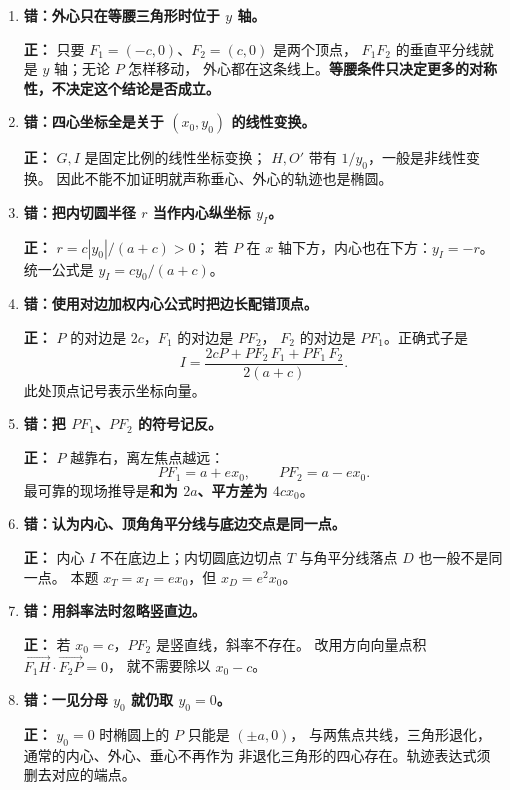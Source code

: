 \begin{trapbox}
\begin{enumerate}
 \item \textbf{错：外心只在等腰三角形时位于 $y$ 轴。}

 \textbf{正：} 只要 $F_1=(-c,0)$、$F_2=(c,0)$ 是两个顶点，
 $F_1F_2$ 的垂直平分线就是 $y$ 轴；无论 $P$ 怎样移动，
 外心都在这条线上。\textbf{等腰条件只决定更多的对称性，不决定这个结论是否成立。}

 \item \textbf{错：四心坐标全是关于 $(x_0,y_0)$ 的线性变换。}

 \textbf{正：} $G,I$ 是固定比例的线性坐标变换；
 $H,O'$ 带有 $1/y_0$，一般是非线性变换。
 因此不能不加证明就声称垂心、外心的轨迹也是椭圆。

 \item \textbf{错：把内切圆半径 $r$ 当作内心纵坐标 $y_I$。}

 \textbf{正：} $r=c|y_0|/(a+c)>0$；
 若 $P$ 在 $x$ 轴下方，内心也在下方：$y_I=-r$。
 统一公式是 $\displaystyle y_I=cy_0/(a+c)$。

 \item \textbf{错：使用对边加权内心公式时把边长配错顶点。}

 \textbf{正：} $P$ 的对边是 $2c$，$F_1$ 的对边是 $PF_2$，
 $F_2$ 的对边是 $PF_1$。正确式子是
 \[
 I=\frac{2cP+PF_2\,F_1+PF_1\,F_2}{2(a+c)}.
 \]
 此处顶点记号表示坐标向量。

 \item \textbf{错：把 $PF_1$、$PF_2$ 的符号记反。}

 \textbf{正：} $P$ 越靠右，离左焦点越远：
 \[
 PF_1=a+ex_0,\qquad PF_2=a-ex_0.
 \]
 最可靠的现场推导是\textbf{和为 $2a$、平方差为 $4cx_0$}。

 \item \textbf{错：认为内心、顶角角平分线与底边交点是同一点。}

 \textbf{正：} 内心 $I$ 不在底边上；内切圆底边切点 $T$ 与角平分线落点 $D$ 也一般不是同一点。
 本题 $x_T=x_I=ex_0$，但 $x_D=e^2x_0$。

 \item \textbf{错：用斜率法时忽略竖直边。}

 \textbf{正：} 若 $x_0=c$，$PF_2$ 是竖直线，斜率不存在。
 改用方向向量点积 $\overrightarrow{F_1H}\cdot\overrightarrow{F_2P}=0$，
 就不需要除以 $x_0-c$。

 \item \textbf{错：一见分母 $y_0$ 就仍取 $y_0=0$。}

 \textbf{正：} $y_0=0$ 时椭圆上的 $P$ 只能是 $(\pm a,0)$，
 与两焦点共线，三角形退化，通常的内心、外心、垂心不再作为
 非退化三角形的四心存在。轨迹表达式须删去对应的端点。


\end{enumerate}
\end{trapbox}
